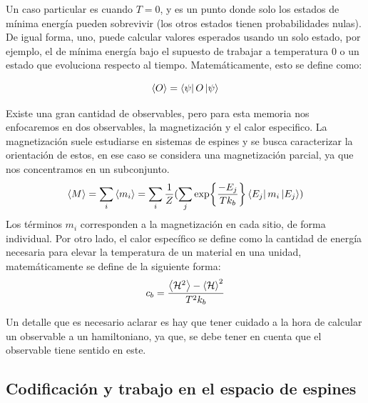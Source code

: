Un caso particular es cuando $T=0$, y es un punto donde solo los estados de mínima energía pueden sobrevivir (los otros estados tienen probabilidades nulas). De igual forma, uno, puede calcular valores esperados usando un solo estado, por ejemplo, el de mínima energía bajo el supuesto de trabajar a temperatura 0 o un estado que evoluciona respecto al tiempo. Matemáticamente, esto se define como:

\begin{equation*}
    \expval{O} = \bra{\psi} O \ket{\psi}
\end{equation*}

Existe una gran cantidad de observables\cite{EfectoMagnetocalorico}, pero para esta memoria nos enfocaremos en dos observables, la magnetización y el calor especifico. La magnetización suele estudiarse en sistemas de espines y se busca caracterizar la orientación de estos, en ese caso se considera una magnetización parcial, ya que nos concentramos en un subconjunto.
\begin{equation*}
    \expval{M} = \sum_i \expval{m_i} = \sum_i \frac{1}{Z}(\sum_j \exp{\frac{-E_j}{Tk_b}} \bra{E_j}m_i\ket{E_j})
\end{equation*}
Los términos $m_i$ corresponden a la magnetización en cada sitio, de forma individual. Por otro lado, el calor específico se define como la cantidad de energía necesaria para elevar la temperatura de un material en una unidad, matemáticamente se define de la siguiente forma:
\begin{equation*}
    c_b = \frac{\expval{\mathcal{H}^2}- \expval{\mathcal{H}}^2}{T^2k_b}
\end{equation*}

Un detalle que es necesario aclarar es hay que tener cuidado a la hora de calcular un observable a un hamiltoniano, ya que, se debe tener en cuenta que el observable tiene sentido en este.

\subsection{Codificación y trabajo en el espacio de espines}

